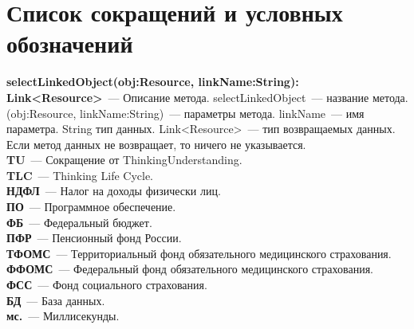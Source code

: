 \chapter*{Список сокращений и условных обозначений}             %

\textbf{selectLinkedObject(obj:Resource, linkName:String): Link<Resource>}~--- Описание метода. selectLinkedObject~--- название метода. (obj:Resource, linkName:String)~--- параметры метода. linkName~--- имя параметра. String тип данных. Link<Resource>~--- тип возвращаемых данных. Если метод данных не возвращает, то ничего не указывается.\\

\textbf{TU}~--- Сокращение от ThinkingUnderstanding.\\

\textbf{TLC}~--- Thinking Life Cycle.\\

\textbf{НДФЛ}~--- Налог на доходы физически лиц.\\

\textbf{ПО}~--- Программное обеспечение.\\

\textbf{ФБ}~--- Федеральный бюджет.\\

\textbf{ПФР}~--- Пенсионный фонд России.\\

\textbf{ТФОМС}~--- Территориальный фонд обязательного медицинского страхования.\\

\textbf{ФФОМС}~--- Федеральный фонд обязательного медицинского страхования.\\

\textbf{ФСС}~--- Фонд социального страхования.\\

\textbf{БД}~--- База данных.\\

\textbf{мс.}~--- Миллисекунды.\\


\clearpage
